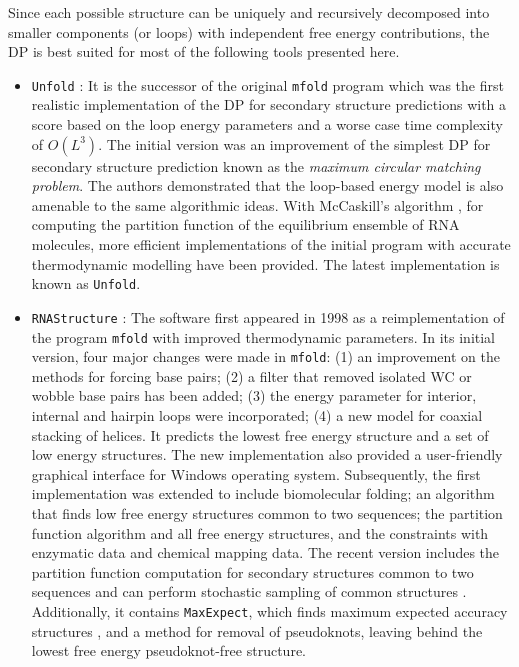 Since each possible structure can be uniquely and recursively decomposed into smaller components (or loops) with independent free energy contributions, the DP is best suited for most of the following tools presented here.

\begin{itemize}
	\item \texttt{Unfold} \cite{zuker1981optimal, zuker1984rna}: It is the successor of the original  \texttt{mfold} program which was the first realistic implementation of the DP for secondary structure predictions with a score based on the loop energy parameters and a worse case time complexity of $O(L^3)$. The initial version was an improvement of the simplest DP for secondary structure prediction known as the \textit{maximum circular matching problem}. The authors demonstrated that the loop-based energy model is also amenable to the same algorithmic ideas. With McCaskill's algorithm \cite{mccaskill1990equilibrium}, for computing the partition function of the equilibrium ensemble of RNA molecules, more efficient implementations of the initial program with accurate thermodynamic modelling have been provided. The latest implementation is known as \texttt{Unfold}.
	
	\item \texttt{RNAStructure} \cite{matthews1998updated,reuter2010rnastructure}: The software first appeared in 1998 as a reimplementation of the program \texttt{mfold} with improved thermodynamic parameters. In its initial version, four major changes were made in \texttt{mfold}: (1) an improvement on the methods for forcing base pairs; (2) a filter that removed isolated WC or wobble base pairs has been added; (3) the energy parameter for interior, internal and hairpin loops were incorporated; (4) a new model for coaxial stacking of helices. It predicts the lowest free energy structure and a set of low energy structures. The new implementation also provided a user-friendly graphical interface for Windows operating system. Subsequently, the first implementation was extended to include biomolecular folding; an algorithm that finds low free energy structures common to two sequences; the partition function algorithm and all free energy structures, and the constraints with enzymatic data and chemical mapping data. The recent version includes the partition function computation for secondary structures common to two sequences and can perform stochastic sampling of common structures \cite{harmanci2009stochastic}. Additionally, it contains \texttt{MaxExpect}, which finds maximum expected accuracy structures \cite{lu2009improved}, and a method for removal of pseudoknots, leaving behind the lowest free energy pseudoknot-free structure. 
	

\end{itemize}
